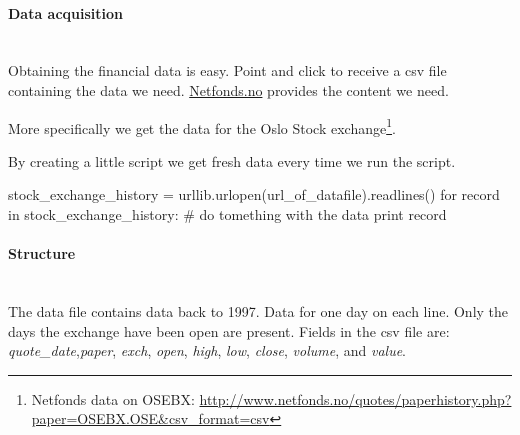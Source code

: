 \paragraph{Data acquisition}
\hspace{0pt}\\
Obtaining the financial data is easy. Point and click to receive a csv file
containing the data we need. \url{Netfonds.no} provides the content we need.

More specifically we get the data for the Oslo Stock exchange\footnote{Netfonds
data on OSEBX:
\url{http://www.netfonds.no/quotes/paperhistory.php?paper=OSEBX.OSE&csv_format=csv}}. 

By creating a little script we get fresh data every time we run the script.
\begin{python}
stock_exchange_history = urllib.urlopen(url_of_datafile).readlines()
    for record in stock_exchange_history:
        # do tomething with the data
        print record
\end{python} 

\paragraph{Structure}
\hspace{0pt}\\
The data file contains data back to 1997. Data for one day on each line. Only
the days the exchange have been open are present.
Fields in the csv file are: \textit{quote\_date},\textit{paper},
\textit{exch}, \textit{open}, \textit{high}, \textit{low}, \textit{close},
\textit{volume}, and \textit{value}.
%

